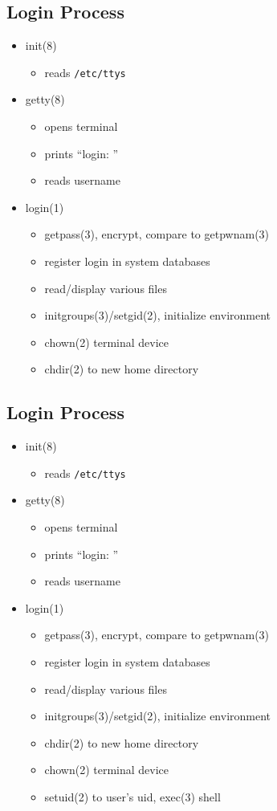 \documentclass[xga]{xdvislides}
\begin{document}
\subsection{Login Process}
\begin{itemize}
	\item init(8)
		\begin{itemize}
			\item reads {\tt /etc/ttys}
		\end{itemize}
	\item getty(8)
		\begin{itemize}
			\item opens terminal
			\item prints ``login: ''
			\item reads username
		\end{itemize}
	\item login(1)
		\begin{itemize}
			\item getpass(3), encrypt, compare to getpwnam(3)
			\item register login in system databases
			\item read/display various files
			\item initgroups(3)/setgid(2), initialize environment
			\item chown(2) terminal device
			\item chdir(2) to new home directory
		\end{itemize}
\end{itemize}

\subsection{Login Process}
\begin{itemize}
	\item init(8)
		\begin{itemize}
			\item reads {\tt /etc/ttys}
		\end{itemize}
	\item getty(8)
		\begin{itemize}
			\item opens terminal
			\item prints ``login: ''
			\item reads username
		\end{itemize}
	\item login(1)
		\begin{itemize}
			\item getpass(3), encrypt, compare to getpwnam(3)
			\item register login in system databases
			\item read/display various files
			\item initgroups(3)/setgid(2), initialize environment
			\item chdir(2) to new home directory
			\item chown(2) terminal device
			\item setuid(2) to user's uid, exec(3) shell
		\end{itemize}
\end{itemize}
\end{document}
